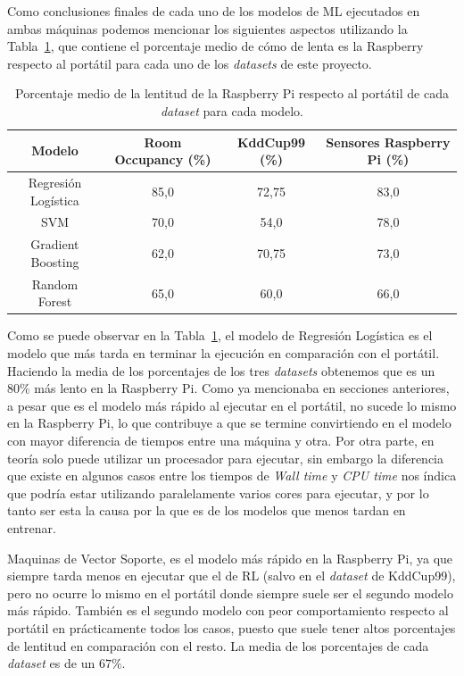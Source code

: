 \documentclass[a4paper, 12pt]{book}
\begin{document}
Como conclusiones finales de cada uno de los modelos de ML ejecutados en ambas máquinas podemos mencionar los siguientes aspectos utilizando la Tabla~\ref{tab:mean_per}, que contiene el porcentaje medio de cómo de lenta es la Raspberry respecto al portátil para cada uno de los \textit{datasets} de este proyecto.

\begin{table}[htb]
\renewcommand{\arraystretch}{1.5}
\begin{adjustbox}{width=\textwidth}
\centering
    \begin{tabular}{c  c  c  c}
    \toprule
    Modelo & Room Occupancy (\%) & KddCup99 (\%) & Sensores Raspberry Pi (\%)\\
    \midrule
     Regresión Logística & 85,0 & 72,75 & 83,0\\
     SVM & 70,0 & 54,0 & 78,0\\
     Gradient Boosting & 62,0 & 70,75 & 73,0\\
     Random Forest & 65,0 & 60,0 & 66,0\\
    \bottomrule
    \end{tabular}
\end{adjustbox}
\caption{Porcentaje medio de la lentitud de la Raspberry Pi respecto al portátil de cada \textit{dataset} para cada modelo.}
\label{tab:mean_per}
\end{table}

Como se puede observar en la Tabla~\ref{tab:mean_per}, el modelo de Regresión Logística es el modelo que más tarda en terminar la ejecución en comparación con el portátil. Haciendo la media de los porcentajes de los tres \textit{datasets} obtenemos que es un $80\%$ más lento en la Raspberry Pi. Como ya mencionaba en secciones anteriores, a pesar que es el modelo más rápido al ejecutar en el portátil, no sucede lo mismo en la Raspberry Pi, lo que contribuye a que se termine convirtiendo en el modelo con mayor diferencia de tiempos entre una máquina y otra. Por otra parte, en teoría solo puede utilizar un procesador para ejecutar, sin embargo la diferencia que existe en algunos casos entre los tiempos de \textit{Wall time} y \textit{CPU time} nos índica que podría estar utilizando paralelamente varios cores para ejecutar, y por lo tanto ser esta la causa por la que es de los modelos que menos tardan en entrenar.

Maquinas de Vector Soporte, es el modelo más rápido en la Raspberry Pi, ya que siempre tarda menos en ejecutar que el de RL (salvo en el \textit{dataset} de KddCup99), pero no ocurre lo mismo en el portátil donde siempre suele ser el segundo modelo más rápido. También es el segundo modelo con peor comportamiento respecto al portátil en prácticamente todos los casos, puesto que suele tener altos porcentajes de lentitud en comparación con el resto. La media de los porcentajes de cada \textit{dataset} es de un $67\%$.
\end{document}
